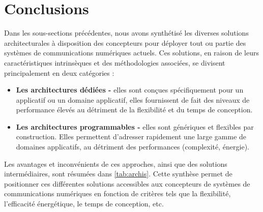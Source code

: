 \documentclass[../main.tex]{subfiles}
\begin{document}
\section{Conclusions}

Dans les sous-sections précédentes, nous avons synthétisé les diverses solutions architecturales à disposition des concepteurs pour déployer tout ou partie des systèmes de communications numériques actuels. Ces solutions, en raison de leurs caractéristiques intrinsèques et des méthodologies associées, se divisent principalement en deux catégories :

\begin{itemize}
    \item[\boldsymbol{-}] \textbf{Les architectures dédiées -} elles sont conçues spécifiquement pour un applicatif ou un domaine applicatif, elles fournissent de fait des niveaux de performance élevés au détriment de la flexibilité et du temps de conception.
    \item[\boldsymbol{-}] \textbf{Les architectures programmables -} elles sont génériques et flexibles par construction. Elles permettent d’adresser rapidement une large gamme de domaines applicatifs, au détriment des performances (complexité, énergie).
\end{itemize}


Les avantages et inconvénients de ces approches, ainsi que des solutions intermédiaires, sont résumées dans \ref{tab:archis}. Cette synthèse permet de positionner ces différentes solutions accessibles aux concepteurs de systèmes de communications numériques en fonction de critères tels que la flexibilité, l'efficacité énergétique, le temps de conception, etc.
\end{document}
